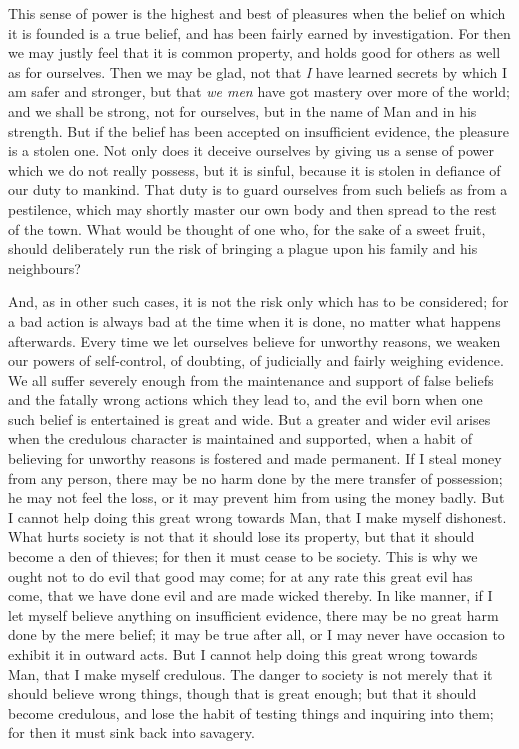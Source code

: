 \documentclass[12pt]{article}
\begin{document}
This sense of power is the highest and best of pleasures when the belief on which it is founded is a true belief, and has been fairly earned by investigation. For then we may justly feel that it is common property, and holds good for others as well as for ourselves. Then we may be glad, not that \emph{I} have learned secrets by which I am safer and stronger, but that \emph{we men} have got mastery over more of the world; and we shall be strong, not for ourselves, but in the name of Man and in his strength. But if the belief has been accepted on insufficient evidence, the pleasure is a stolen one. Not only does it deceive ourselves by giving us a sense of power which we do not really possess, but it is sinful, because it is stolen in defiance of our duty to mankind. That duty is to guard ourselves from such beliefs as from a pestilence, which may shortly master our own body and then spread to the rest of the town. What would be thought of one who, for the sake of a sweet fruit, should deliberately run the risk of bringing a plague upon his family and his neighbours?

And, as in other such cases, it is not the risk only which has to be considered; for a bad action is always bad at the time when it is done, no matter what happens afterwards. Every time we let ourselves believe for unworthy reasons, we weaken our powers of self-control, of doubting, of judicially and fairly weighing evidence. We all suffer severely enough from the maintenance and support of false beliefs and the fatally wrong actions which they lead to, and the evil born when one such belief is entertained is great and wide. But a greater and wider evil arises when the credulous character is maintained and supported, when a habit of believing for unworthy reasons is fostered and made permanent. If I steal money from any person, there may be no harm done by the mere transfer of possession; he may not feel the loss, or it may prevent him from using the money badly. But I cannot help doing this great wrong towards Man, that I make myself dishonest. What hurts society is not that it should lose its property, but that it should become a den of thieves; for then it must cease to be society. This is why we ought not to do evil that good may come; for at any rate this great evil has come, that we have done evil and are made wicked thereby. In like manner, if I let myself believe anything on insufficient evidence, there may be no great harm done by the mere belief; it may be true after all, or I may never have occasion to exhibit it in outward acts. But I cannot help doing this great wrong towards Man, that I make myself credulous. The danger to society is not merely that it should believe wrong things, though that is great enough; but that it should become credulous, and lose the habit of testing things and inquiring into them; for then it must sink back into savagery.
\end{document}
